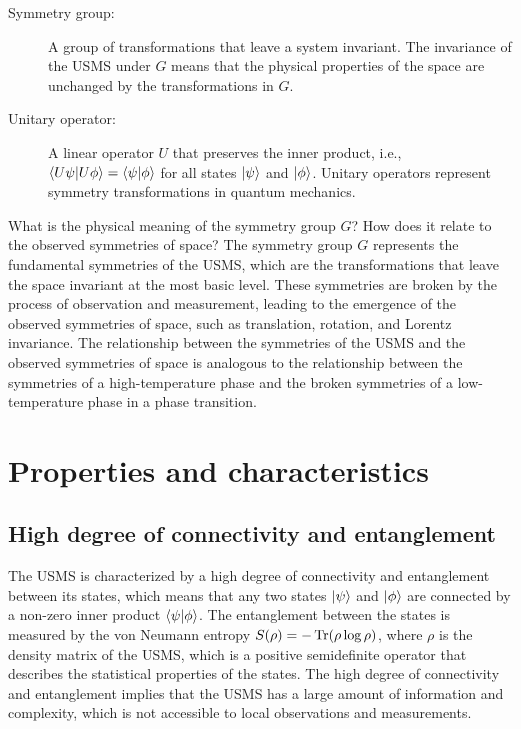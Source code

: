 \begin{tcolorbox}[colback=blue!5!white,colframe=blue!75!black,title=New terms]
\begin{description}
\item[Symmetry group:] A group of transformations that leave a system invariant. The invariance of the USMS under $G$ means that the physical properties of the space are unchanged by the transformations in $G$.
\item[Unitary operator:] A linear operator $U$ that preserves the inner product, i.e., $\braket{U\psi|U\phi} = \braket{\psi|\phi}$ for all states $\ket{\psi}$ and $\ket{\phi}$. Unitary operators represent symmetry transformations in quantum mechanics.
\end{description}
\end{tcolorbox}

\begin{tcolorbox}[colback=green!5!white,colframe=green!75!black,title=Question]
What is the physical meaning of the symmetry group $G$? How does it relate to the observed symmetries of space?
\tcblower
The symmetry group $G$ represents the fundamental symmetries of the USMS, which are the transformations that leave the space invariant at the most basic level. These symmetries are broken by the process of observation and measurement, leading to the emergence of the observed symmetries of space, such as translation, rotation, and Lorentz invariance. The relationship between the symmetries of the USMS and the observed symmetries of space is analogous to the relationship between the symmetries of a high-temperature phase and the broken symmetries of a low-temperature phase in a phase transition.
\end{tcolorbox}

\section{Properties and characteristics}
\subsection{High degree of connectivity and entanglement}
The USMS is characterized by a high degree of connectivity and entanglement between its states, which means that any two states $\ket{\psi}$ and $\ket{\phi}$ are connected by a non-zero inner product $\braket{\psi|\phi}$. The entanglement between the states is measured by the von Neumann entropy $S(\rho) = -\operatorname{Tr}(\rho \log \rho)$, where $\rho$ is the density matrix of the USMS, which is a positive semidefinite operator that describes the statistical properties of the states. The high degree of connectivity and entanglement implies that the USMS has a large amount of information and complexity, which is not accessible to local observations and measurements.

